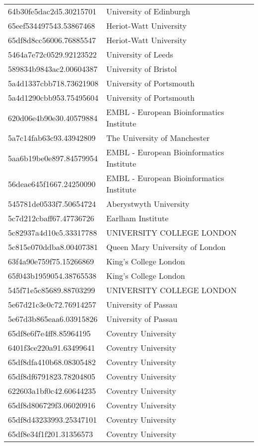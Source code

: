 \begin{tabular}{ll}
64b30fe5dac2d5.30215701 & University of Edinburgh \\
65eef534497543.53867468 & Heriot-Watt University \\
65df8d8cc56006.76885547 & Heriot-Watt University \\
5464a7e72c0529.92123522 & University of Leeds \\
589834b9843ac2.00604387 & University of Bristol \\
5a4d1337cbb718.73621908 & University of Portsmouth \\
5a4d1290cbb953.75495604 & University of Portsmouth \\
620d06e4b90e30.40579884 & EMBL - European Bioinformatics Institute \\
5a7c14fab63c93.43942809 & The University of Manchester \\
5aa6b19be0e897.84579954 & EMBL - European Bioinformatics Institute \\
56deae645f1667.24250090 & EMBL - European Bioinformatics Institute \\
545781de0533f7.50654724 & Aberystwyth University \\
5c7d212cbaff67.47736726 & Earlham Institute \\
5c82937a4d10e5.33317788 & UNIVERSITY COLLEGE LONDON \\
5c815e070ddba8.00407381 & Queen Mary University of London \\
63f4a90e759f75.15266869 & King's College London \\
65f043b1959054.38765538 & King's College London \\
545f71e5c85689.88703299 & UNIVERSITY COLLEGE LONDON \\
5e67d21c3e0c72.76914257 & University of Passau \\
5e67d3b865eaa6.03915826 & University of Passau \\
65df8e6f7e4ff8.85964195 & Coventry University \\
6401f3ce220a91.63499641 & Coventry University \\
65df8dfa410b68.08305482 & Coventry University \\
65df8df6791823.78204805 & Coventry University \\
622603a1bf0c42.60644235 & Coventry University \\
65df8d806729f3.06020916 & Coventry University \\
65df8d43233993.25347101 & Coventry University \\
65df8e34f1f201.31356573 & Coventry University \\

\end{tabular}
